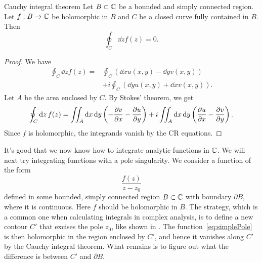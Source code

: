 \begin{theorem}{Cauchy integral theorem}{}
Let $B\subset\mathbb{C}$ be a bounded and simply connected region. Let $f:B\to\mathbb{C}$ be
holomorphic in $B$ and $C$ be a closed curve fully contained in $B$. Then
$$
  \oint_C\dd{z}f(z)=0.
$$
\begin{proof}
We have
\begin{equation*}\begin{aligned}
\oint_C\dd{z}f(z)=&\oint_C\left(\dd{x}u(x,y)-\dd{y}v(x,y)\right)\\
                 &+i\oint_C\left(\dd{y}u(x,y)+\dd{x}v(x,y)\right).
\end{aligned}\end{equation*}
Let $A$ be the area enclosed by $C$. By Stokes' theorem, we get
\begin{equation*}
\oint_C\dd{z}f(z)=\iint_A\dd{x}\dd{y}\left(-\pdv{v}{x}-\pdv{u}{y}\right)
                   +i\iint_A\dd{x}\dd{y}\left(\pdv{u}{x}-\pdv{v}{y}\right).
\end{equation*}
Since $f$ is holomorphic, the integrands vanish by the CR equations.
\end{proof}
\end{theorem}

It's good that we now know how to integrate analytic functions in $\mathbb{C}$. We will
next try integrating functions with a pole singularity. We consider a function
of the form
\begin{equation}\label{eq:simplePole}
\frac{f(z)}{z-z_0}
\end{equation}
defined in some bounded, simply connected region $B\subset\mathbb{C}$ with boundary
$\partial B$, where it is continuous. Here $f$ should be holomorphic in $B$.
The strategy, which is a
common one when calculating integrals in complex analysis, is to define a new
contour $C'$ that excises the pole $z_0$, like shown in .
The function~\eqref{eq:simplePole} is then holomorphic in the region
enclosed by $C'$, and hence it vanishes along $C'$ by the Cauchy integral
theorem.
What remains is to figure out what the difference is between $C'$ and 
$\partial B$.

